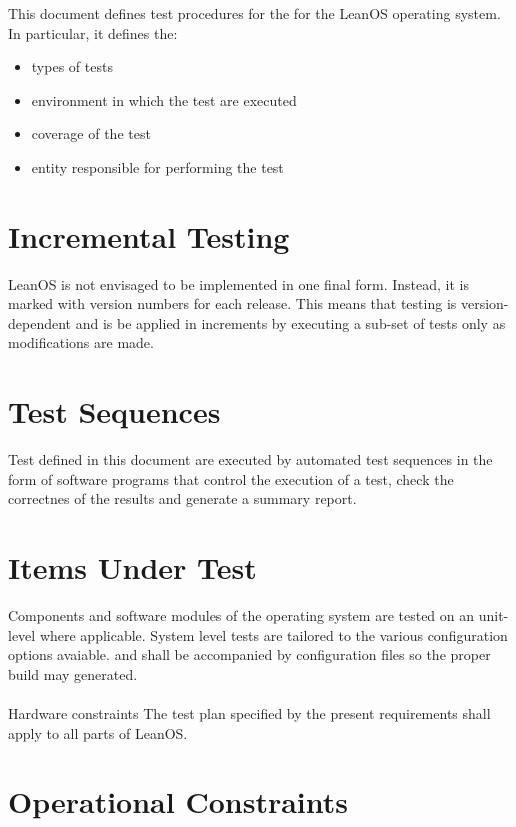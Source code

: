 This document defines test procedures for the for the LeanOS operating system.
In particular, it defines the:
\begin{itemize}
	\item types of tests
	\item environment in which the test are executed
	\item coverage of the test
	\item entity responsible for performing the test
\end{itemize}


\section{Incremental Testing}

LeanOS is not envisaged to be implemented in one final form. Instead, it is
marked with version numbers for each release. This means that testing is
version-dependent and is be applied in increments by executing a sub-set of
tests only as modifications are made.


\section{Test Sequences}

Test defined in this document are executed by automated test sequences in the
form of software programs that control the execution of a test, check the
correctnes of the results and generate a summary report.



\section{Items Under Test}

Components and software modules of the operating system are tested on an
unit-level where applicable. System level tests are tailored to the
various configuration options avaiable. and shall be accompanied by
configuration files so the proper build may generated.\\
\\

 {Hardware constraints}{%
The test plan specified by the present requirements shall apply to all parts %
of LeanOS.
}{}



\section{Operational Constraints}


